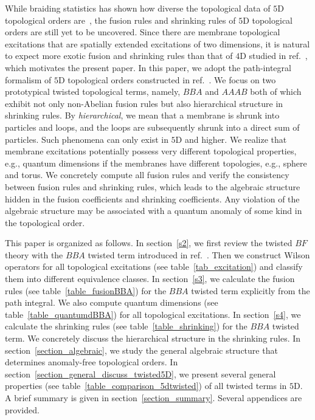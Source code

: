 \documentclass[11pt,nofootinbib,preprint]{revtex4-1}
\begin{document}
While braiding statistics has shown how diverse the topological data of $5$D topological orders are~\cite{Zhang:2021ycl}, the fusion rules and shrinking rules of $5$D topological orders are still yet to be uncovered. Since  there are  membrane topological excitations that are spatially extended excitations of two dimensions, it is natural to expect more exotic fusion and shrinking rules than that of $4$D studied in ref.~\cite{PhysRevB.107.165117}, which motivates the present paper. In this paper, we adopt the path-integral formalism of $5$D topological orders constructed in ref.~\cite{Zhang:2021ycl}. We focus   on two prototypical twisted topological terms, namely, $BBA$ and $AAAB$ both of which exhibit not only non-Abelian fusion rules but also   hierarchical structure in shrinking rules.  By \textit{hierarchical}, we mean that a membrane is  shrunk into  particles and loops, and  the loops are subsequently shrunk into a direct sum of particles. Such phenomena can only exist in $5$D and higher.  We  realize that membrane excitations potentially possess very different topological properties, e.g., quantum dimensions if the membranes have different topologies, e.g., sphere and torus. We concretely compute all fusion rules and verify the consistency between fusion rules and shrinking rules, which leads to the algebraic structure hidden in the fusion coefficients and shrinking coefficients. Any violation of the algebraic structure may be associated with a quantum anomaly of some kind in the topological order. 
   
     This paper is organized as follows. In section~\ref{s2}, we first review the twisted $BF$ theory with the $BBA$ twisted term introduced in ref.~\cite{Zhang:2021ycl}. Then we construct Wilson operators for all topological excitations (see table~\ref{tab_excitation}) and classify them into different equivalence classes. In section~\ref{s3}, we calculate the fusion rules (see table~\ref{table_fusionBBA}) for the $BBA$ twisted term explicitly from the path integral. We also compute quantum dimensions (see table~\ref{table_quantumdBBA}) for all topological excitations. In section~\ref{s4}, we calculate the shrinking rules (see table~\ref{table_shrinking}) for the $BBA$ twisted term. We concretely discuss the hierarchical structure in the shrinking rules. In section~\ref{section_algebraic}, we study the general algebraic structure that determines anomaly-free topological orders. In section~\ref{section_general_discuss_twisted5D}, we present several general properties (see table~\ref{table_comparison_5dtwisted}) of all twisted terms in $5$D. 
A brief summary is given in section~\ref{section_summary}. Several appendices are provided.
\end{document}
